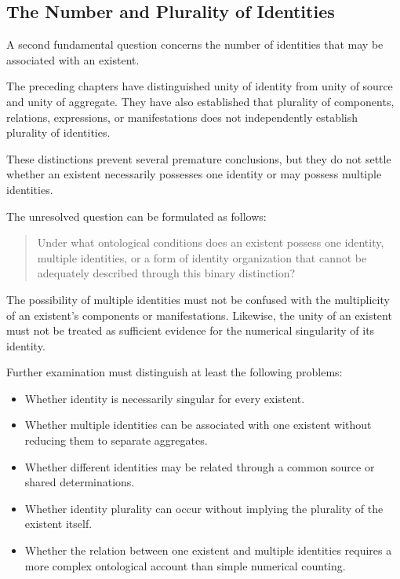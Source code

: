 \subsection{The Number and Plurality of Identities}

A second fundamental question concerns the number of
identities that may be associated with an existent.

The preceding chapters have distinguished unity of
identity from unity of source and unity of aggregate.
They have also established that plurality of components,
relations, expressions, or manifestations does not
independently establish plurality of identities.

These distinctions prevent several premature conclusions,
but they do not settle whether an existent necessarily
possesses one identity or may possess multiple identities.

The unresolved question can be formulated as follows:

\begin{quote}
Under what ontological conditions does an existent
possess one identity, multiple identities, or a form
of identity organization that cannot be adequately
described through this binary distinction?
\end{quote}

The possibility of multiple identities must not be
confused with the multiplicity of an existent's
components or manifestations. Likewise, the unity of
an existent must not be treated as sufficient evidence
for the numerical singularity of its identity.

Further examination must distinguish at least the
following problems:

\begin{itemize}
    \item Whether identity is necessarily singular for
    every existent.
    \item Whether multiple identities can be associated
    with one existent without reducing them to separate
    aggregates.
    \item Whether different identities may be related
    through a common source or shared determinations.
    \item Whether identity plurality can occur without
    implying the plurality of the existent itself.
    \item Whether the relation between one existent and
    multiple identities requires a more complex
    ontological account than simple numerical counting.
\end{itemize}

